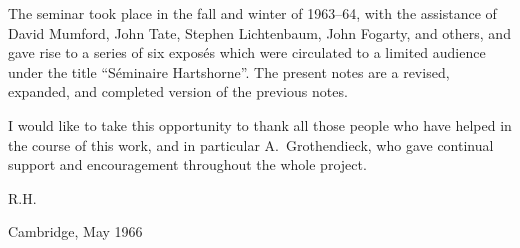 \documentclass[12pt]{book}
\theoremstyle{definition}
\theoremstyle{plain}
\begin{document}
The seminar took place in the fall and winter of 1963--64, with the assistance of David Mumford, John Tate, Stephen Lichtenbaum, John Fogarty, and others, and gave rise to a series of six exposés which were circulated to a limited audience under the title ``Séminaire Hartshorne''. The present notes are a revised, expanded, and completed version of the previous notes.

I would like to take this opportunity to thank all those people who have helped in the course of this work, and in particular A.~Grothendieck, who gave continual support and encouragement throughout the whole project.

\vspace{1cm}
\hfill R.H.\par
\hfill Cambridge, May 1966

\clearpage
\tableofcontents

\mainmatter
\renewcommand{\thechapter}{\Roman{chapter}}









\end{document}
